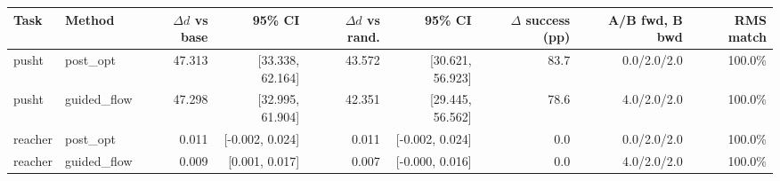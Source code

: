 \begin{tabular}{llrrrrrrr}
\toprule
Task & Method & $\Delta d$ vs base & 95\% CI & $\Delta d$ vs rand. & 95\% CI & $\Delta$ success (pp) & A/B fwd, B bwd & RMS match \\
\midrule
pusht & post_opt & 47.313 & [33.338, 62.164] & 43.572 & [30.621, 56.923] & 83.7 & 0.0/2.0/2.0 & 100.0\% \\
pusht & guided_flow & 47.298 & [32.995, 61.904] & 42.351 & [29.445, 56.562] & 78.6 & 4.0/2.0/2.0 & 100.0\% \\
reacher & post_opt & 0.011 & [-0.002, 0.024] & 0.011 & [-0.002, 0.024] & 0.0 & 0.0/2.0/2.0 & 100.0\% \\
reacher & guided_flow & 0.009 & [0.001, 0.017] & 0.007 & [-0.000, 0.016] & 0.0 & 4.0/2.0/2.0 & 100.0\% \\
\bottomrule
\end{tabular}
